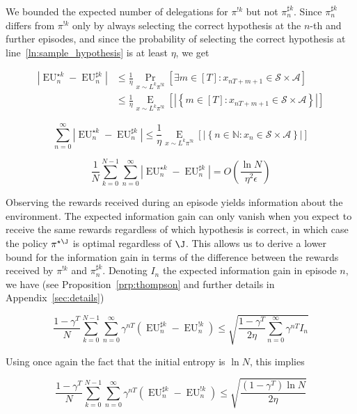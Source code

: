 \documentclass[anon,12pt]{colt2018} %
\newcommand{\AP}[1]{\left(#1\right)}
\newcommand{\AB}[1]{\left[#1\right]}
\newcommand{\AC}[1]{\left\{#1\right\}}
\newcommand{\Pa}[2]{\underset{#1}{\operatorname{Pr}}\AB{#2}}
\newcommand{\Ea}[2]{\underset{#1}{\operatorname{E}}\AB{#2}}
\newcommand{\Nats}{\mathbb{N}}
\newcommand{\Abs}[1]{\left\vert #1 \right\vert}
\newcommand{\A}{\mathcal{A}}
\newcommand{\St}{\mathcal{S}}
\newcommand{\EU}{\operatorname{EU}}
\begin{document}
We bounded the expected number of delegations for $\pi^{!k}$ but not $\pi^{\sharp k}_n$. Since $\pi^{\sharp k}_n$ differs from $\pi^{!k}$ only by always selecting the correct hypothesis at the $n$-th and further episodes, and since the probability of selecting the correct hypothesis at line~\ref{ln:sample_hypothesis} is at least $\eta$, we get

\begin{align*}
\Abs{\EU^{\star k}_n-\EU^{\sharp k}_n} &\leq \frac{1}{\eta}\Pa{x\sim L^k\pi^{!k}}{\exists m \in [T]: x_{nT+m+1}\in\St \times \A} \\ 
&\leq \frac{1}{\eta}\Ea{x\sim L^k\pi^{!k}}{\Abs{\AC{m \in [T]: x_{nT+m+1}\in\St \times \A}}}
\end{align*}

\begin{equation}
\label{eqn:sharp_vs_star_via_delegations}
\sum_{n=0}^\infty {\Abs{\EU^{\star k}_n-\EU^{\sharp k}_n}} \leq \frac{1}{\eta}\Ea{x\sim L^k\pi^{!k}}{\Abs{\AC{n \in \Nats: x_n\in\St \times \A}}}
\end{equation}

\begin{equation}
\label{eqn:sharp_vs_star}
\frac{1}{N}\sum_{k=0}^{N-1}\sum_{n=0}^\infty {\Abs{\EU^{\star k}_n-\EU^{\sharp k}_n}} = O\AP{\frac{\ln{N}}{\eta^2\epsilon}}
\end{equation}

Observing the rewards received during an episode yields information about the environment. The expected information gain can only vanish when you expect to receive the same rewards regardless of which hypothesis is correct, in which case the policy $\pi^{\star\J}$ is optimal regardless of $\J$. This allows us to derive a lower bound for the information gain in terms of the difference between the rewards received by $\pi^{!k}$ and $\pi^{\sharp k}_n$. Denoting $I_n$ the expected information gain in episode $n$, we have (see Proposition~\ref{prp:thompson} and further details in Appendix~\ref{sec:details})

\begin{equation}
\frac{1-\gamma^T}{N}\sum_{k=0}^{N-1}\sum_{n=0}^\infty \gamma^{nT}\AP{\EU^{\sharp k}_n-\EU^{!k}_n} \leq \sqrt{\frac{1-\gamma^T}{2\eta}\sum_{n=0}^\infty \gamma^{nT}I_n}
\end{equation}

Using once again the fact that the initial entropy is $\ln{N}$, this implies

\begin{equation}
\label{eqn:shriek_vs_sharp}
\frac{1-\gamma^T}{N}\sum_{k=0}^{N-1}\sum_{n=0}^\infty \gamma^{nT}\AP{\EU^{\sharp k}_n-\EU^{!k}_n} \leq \sqrt{\frac{\AP{1-\gamma^T}\ln{N}}{2\eta}}
\end{equation}
\end{document}
